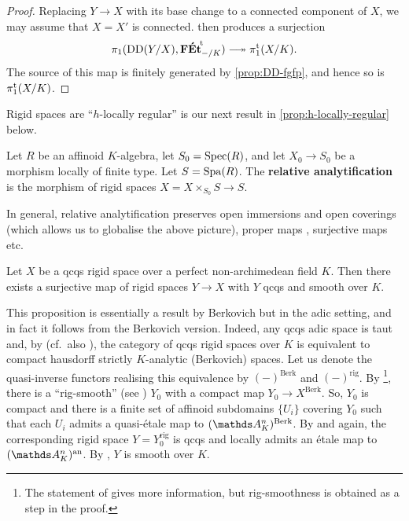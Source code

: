 \begin{proof}
Replacing $Y\to X$ with its base change to a connected component of $X$, we may assume that $X=X'$ is connected.  then produces a surjection
\[ 
    \pi_1(\Desc(Y/X), \FEtt_{-/K}) \surj \pitame(X/K).
\]
The source of this map is finitely generated by \cref{prop:DD-fgfp}, and hence so is $\pi_1^{\mathrm{t}}(X/K)$. 
\end{proof}

Rigid spaces are ``$h$-locally regular'' is our next result in \cref{prop:h-locally-regular} below.

\begin{defi} \label{def:relative-analytification}
    Let $R$ be an affinoid $K$-algebra, let $S_0=\operatorname{Spec}(R)$, and let $X_0\to S_0$ be a morphism locally of finite type. Let $S=\operatorname{Spa}(R)$. The {\bf relative analytification} is the morphism of rigid spaces $X=X\times_{S_0} S\to S$. 
\end{defi}

In general, relative analytification preserves open immersions and open coverings (which allows us to globalise the above picture), proper maps \cite[Lemma~5.7.3]{HuberBook}, surjective maps \cite[Lemma~3.9]{Huber94:Generalization} etc.

\begin{prop} 
\label{prop:h-locally-regular}
    Let $X$ be a qcqs rigid space over a perfect non-archimedean field $K$. Then there exists a surjective map of rigid spaces $Y\to X$ with $Y$ qcqs and smooth over $K$.
\end{prop}

This proposition is essentially a result by Berkovich \cite[Theorem 1.3.1]{Berkovich:VanishingCyclesFormalSchemes} but in the adic setting, and in fact it follows from the Berkovich version.
Indeed, any qcqs adic space is taut and, by  \cite[Proposition 8.3.1+Remark 8.3.2]{HuberBook} (cf.\ also \cite[Theorem 1.6.1]{Berkovich:EtaleCohomology}), the category of qcqs rigid spaces over $K$ is equivalent to compact hausdorff strictly $K$-analytic (Berkovich) spaces. Let us denote the quasi-inverse functors realising this equivalence by $(-)^{\mathrm{Berk}}$ and $(-)^{\mathrm{rig}}$. By \cite[Theorem 1.3.1]{Berkovich:VanishingCyclesFormalSchemes}\footnote{The statement of \cite[Theorem 1.3.1]{Berkovich:VanishingCyclesFormalSchemes} gives more information, but rig-smoothness is obtained as a step in the proof.}, there is a ``rig-smooth'' (see \cite[p.~335]{Berkovich:SmoothLocallyContrII}) $Y_0$ with a compact map $Y_0 \to X^\mathrm{Berk}$. So, $Y_0$ is compact and there is a finite set of affinoid subdomains $\{U_i\}$ covering $Y_0$ such that each $U_i$ admits a quasi-\'etale map to $(\mathbb{A}^n_K)^{\rm Berk}$.
By 
\cite[Lemma 1.6.2]{Berkovich:EtaleCohomology} 
and
\cite[Proposition 8.3.1+Remark 8.3.2]{HuberBook} again,
the corresponding rigid space $Y = Y_0^{\mathrm{rig}}$ is qcqs and locally admits an \'etale map to $(\mathbb{A}^n_K)^{\rm an}$. By \cite[Corollary 1.6.10]{HuberBook}, $Y$ is smooth over $K$.

